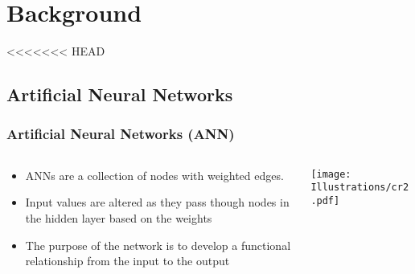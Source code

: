 \documentclass{beamer}
\begin{document}
\section{Background}
<<<<<<< HEAD

\subsection{Artificial Neural Networks}
\begin{frame}
  \frametitle{Artificial Neural Networks (ANN)}
\begin{columns}
  \begin{column}{0.5\textwidth}
\begin{itemize}
\item ANNs are a collection of nodes with weighted edges.
\item Input values are altered as they pass though nodes in the hidden layer based on the weights
\item The purpose of the network is to develop a functional relationship from the input to the output
\end{itemize}
\end{column}
\begin{column}{0.5\textwidth}
 \texttt{[image: Illustrations/cr2.pdf]}
       \\
\end{column}
\end{columns}
\end{frame}
\end{document}
